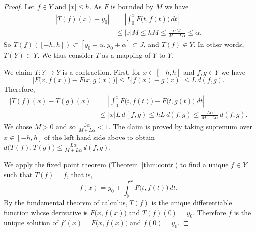 \documentclass[12pt]{book}
\newcommand{\abs}[1]{\left\lvert {#1} \right\rvert}
\theoremstyle{plain}
\theoremstyle{remark}
\theoremstyle{definition}
\theoremstyle{exercise}
\newtheorem{exercise}{Exercise}[section]
\theoremstyle{example}
\newcommand{\thmref}[1]{\hyperref[#1]{Theorem~\ref*{#1}}}
\begin{document}
\begin{proof}
Let $f \in Y$ and $\abs{x} \leq h$.
As $F$ is bounded by $M$ we have
\begin{equation*}
\begin{split}
\abs{T(f)(x) - y_0}
&= \abs{\int_0^x F\bigl(t,f(t)\bigr)~dt} \\
& \leq 
\abs{x}M \leq hM \leq \frac{\alpha M}{M+ L\alpha} \leq \alpha .
\end{split}
\end{equation*}
So $T(f)([-h,h]) \subset [y_0-\alpha,y_0+\alpha] \subset J$, and
$T(f) \in Y$.  In other words, $T(Y) \subset Y$.  We thus consider
$T$ as a mapping of $Y$ to $Y$.

We claim $T \colon Y \to Y$ is a contraction.  First, for $x \in [-h,h]$
and $f,g \in Y$ we have
\begin{equation*}
\abs{F\bigl(x,f(x)\bigr) - F\bigl(x,g(x)\bigr)} \leq
L\abs{f(x)- g(x)} \leq L \, d(f,g) .
\end{equation*}
Therefore,
\begin{equation*}
\begin{split}
\abs{T(f)(x) - T(g)(x)}
&= \abs{\int_0^x F\bigl(t,f(t)\bigr) - F\bigl(t,g(t)\bigr)~dt} \\
& \leq \abs{x} L \, d(f,g)
 \leq h L\, d(f,g)
 \leq \frac{L\alpha}{M+L\alpha} \, d(f,g) .
\end{split}
\end{equation*}
We chose $M > 0$ and so
$\frac{L\alpha}{M+L\alpha} < 1$.  The claim is proved by
taking supremum over $x \in [-h,h]$ of the left hand side above to obtain
$d\bigl(T(f),T(g)\bigr) \leq \frac{L\alpha}{M+L\alpha} \, d(f,g)$.

We apply the fixed point theorem (\thmref{thm:contr})
to find a unique $f \in Y$ such that $T(f) = f$, that is,
\begin{equation*} %
f(x) = y_0 + \int_0^x F\bigl(t,f(t)\bigr)~dt .
\end{equation*}
By the fundamental theorem of calculus, $T(f)$ is the unique differentiable 
function whose derivative is
$F\bigl(x,f(x)\bigr)$ and $T(f)(0) = y_0$.  Therefore $f$ is the unique
solution of $f'(x) = F\bigl(x,f(x)\bigr)$ and $f(0) = y_0$.
\end{proof}

\end{document}
